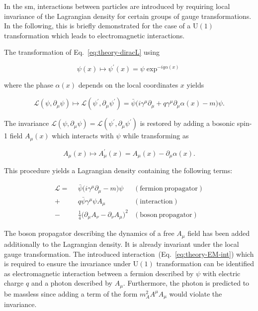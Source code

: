 In the \gls{sm}, interactions between particles are introduced by requiring local invariance of the Lagrangian density for certain groups of gauge transformations. In the following, this is briefly demonstrated for the case of a $\mathrm{U(1)}$ transformation which leads to electromagnetic interactions.

The transformation of Eq.~\ref{eq:theory-diracL} using 

\begin{equation}
\psi(x)\mapsto\psi^{\prime}(x)=\psi\exp^{-iq\alpha(x)}
\end{equation}

where the phase $\alpha(x)$ depends on the local coordinates $x$ yields

\begin{equation}
\mathcal{L}(\psi,\partial_\mu\psi)\mapsto\mathcal{L}(\psi^{\prime},\partial_\mu\psi^{\prime})=\bar{\psi}\big(i\gamma^\mu\partial_\mu+q\gamma^\mu\partial_\mu\alpha(x)-m\big)\psi.
\end{equation}

The invariance $\mathcal{L}(\psi,\partial_\mu\psi)=\mathcal{L}(\psi^{\prime},\partial_\mu\psi^{\prime})$ is restored by adding a bosonic spin-1 field $A_{\mu}(x)$ which interacts with $\psi$ while transforming as

\begin{equation}
A_{\mu}(x)\mapsto A^{\prime}_{\mu}(x)=A_\mu(x)-\partial_\mu\alpha(x).
\end{equation}

This procedure yields a Lagrangian density containing the following terms:

\begin{align}
\mathcal{L}=~~&\bar{\psi}\big(i\gamma^\mu\partial_\mu-m\big)\psi &(\mathrm{fermion~propagator}) \\
            +&q\bar{\psi}\gamma^{\mu}\psi A_{\mu} &(\mathrm{interaction}) \label{eq:theory-EM-int}\\
            -&\tfrac{1}{4}\big(\partial_\mu A_\nu-\partial_\nu A_\mu\big)^{2} &(\mathrm{boson~propagator})
\end{align}

The boson propagator describing the dynamics of a free $A_\mu$ field has been added additionally to the Lagrangian density. It is already invariant under the local gauge transformation. The introduced interaction~(Eq.~\ref{eq:theory-EM-int}) which is required to ensure the invariance under $\mathrm{U(1)}$ transformation can be identified as electromagnetic interaction between a fermion described by $\psi$ with electric charge $q$ and a photon described by $A_\mu$. Furthermore, the photon is predicted to be massless since adding a term of the form $m^{2}_{A}A^\mu A_\mu$ would violate the invariance.

